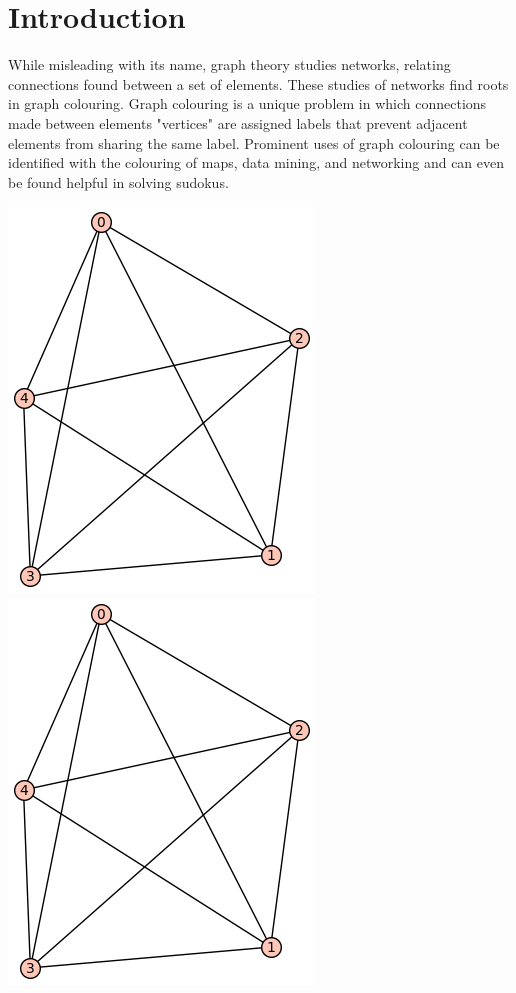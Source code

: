 \documentclass[12pt, letterpaper, twoside]{article}
\begin{document}
\clearpage

\section{Introduction}
While misleading with its name, graph theory studies networks, relating connections found between a set of elements. These studies of networks find roots in graph colouring. 
Graph colouring is a unique problem in which connections made between elements "vertices" are assigned labels that prevent adjacent elements from sharing the same label.
Prominent uses of graph colouring can be identified with the colouring of maps, data mining, and networking and can even be found helpful in solving sudokus.

\includegraphics[scale=.35]{test}
\includegraphics[scale=.35]{test}
\end{document}

